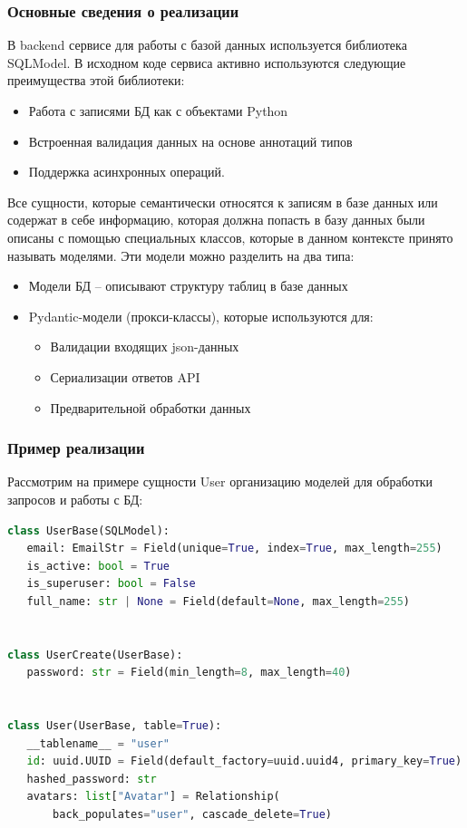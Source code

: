 \subsubsection{Основные сведения о реализации}
В backend сервисе для работы с базой данных используется библиотека SQLModel. В исходном коде сервиса активно используются следующие преимущества этой библиотеки:
\begin{itemize}
  \item Работа с записями БД как с объектами Python
  \item Встроенная валидация данных на основе аннотаций типов
  \item Поддержка асинхронных операций.
\end{itemize}

Все сущности, которые семантически относятся к записям в базе данных или содержат в себе информацию, которая должна попасть в базу данных были описаны с помощью специальных классов, которые в данном контексте принято называть моделями.
Эти модели можно разделить на два типа:
\begin{itemize}
    \item Модели БД – описывают структуру таблиц в базе данных
    \item Pydantic-модели (прокси-классы), которые используются для:
    \begin{itemize}
        \item Валидации входящих json-данных
        \item Сериализации ответов API
        \item Предварительной обработки данных
    \end{itemize}
\end{itemize}

\subsubsection{Пример реализации}
Рассмотрим на примере сущности User организацию моделей для обработки запросов и работы с БД:
\begin{lstlisting}[language=Python, numbers=none, frame=none]
class UserBase(SQLModel):
   email: EmailStr = Field(unique=True, index=True, max_length=255)
   is_active: bool = True
   is_superuser: bool = False
   full_name: str | None = Field(default=None, max_length=255)


class UserCreate(UserBase):
   password: str = Field(min_length=8, max_length=40)


class User(UserBase, table=True):
   __tablename__ = "user"
   id: uuid.UUID = Field(default_factory=uuid.uuid4, primary_key=True)
   hashed_password: str
   avatars: list["Avatar"] = Relationship(
       back_populates="user", cascade_delete=True)
\end{lstlisting}

